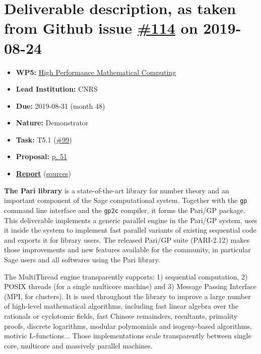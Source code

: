 \hypertarget{deliverable-description-as-taken-from-github-issue-114-on-2019-08-24}{%
\section*{\texorpdfstring{Deliverable description, as taken from Github
issue
\href{https://github.com/OpenDreamKit/OpenDreamKit/issues/114}{\#114} on
2019-08-24}{Deliverable description, as taken from Github issue \#114 on 2019-08-24}}\label{deliverable-description-as-taken-from-github-issue-114-on-2019-08-24}}

\begin{itemize}
\tightlist
\item
  \textbf{WP5:}
  \href{https://github.com/OpenDreamKit/OpenDreamKit/tree/master/WP5}{High
  Performance Mathematical Computing}
\item
  \textbf{Lead Institution:} CNRS
\item
  \textbf{Due:} 2019-08-31 (month 48)
\item
  \textbf{Nature:} Demonstrator
\item
  \textbf{Task:} T5.1
  (\href{https://github.com/OpenDreamKit/OpenDreamKit/issues/99}{\#99})
\item
  \textbf{Proposal:}
  \href{https://github.com/OpenDreamKit/OpenDreamKit/raw/master/Proposal/proposal-www.pdf}{p.
  51}
\item
  \textbf{\href{https://github.com/OpenDreamKit/OpenDreamKit/raw/master/WP5/D5.16/report-final.pdf}{Report}}
  (\href{https://github.com/OpenDreamKit/OpenDreamKit/raw/master/WP5/D5.16/}{sources})
\end{itemize}

\textbf{The Pari library} is a state-of-the-art library for number
theory and an important component of the Sage computational system.
Together with the \texttt{gp} command line interface and the
\texttt{gp2c} compiler, it forms the Pari/GP package. This deliverable
implements a generic parallel engine in the Pari/GP system, uses it
inside the system to implement fast parallel variants of existing
sequential code and exports it for library users. The released Pari/GP
suite (PARI-2.12) makes those improvements and new features available
for the community, in particular Sage users and all softwares using the
Pari library.

The MultiThread engine transparently supports: 1) sequential
computation, 2) POSIX threads (for a single multicore machine) and 3)
Message Passing Interface (MPI, for clusters). It is used throughout the
library to improve a large number of high-level mathematical algorithms,
including fast linear algebra over the rationals or cyclotomic fields,
fast Chinese remainders, resultants, primality proofs, discrete
logarithms, modular polymomials and isogeny-based algorithms, motivic
L-functions... Those implementations scale transparently between single
core, multicore and massively parallel machines.

